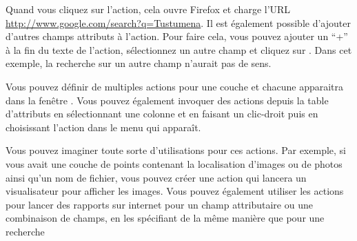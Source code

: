 Quand vous cliquez sur l'action, cela ouvre Firefox et charge l'URL \url{http://www.google.com/search?q=Tustumena}. Il est \'egalement possible d'ajouter d'autres champs attributs \`a l'action. Pour faire cela, vous pouvez ajouter un ``+'' \`a la fin du texte de l'action, s\'electionnez un autre champ et cliquez sur . Dans cet exemple, la recherche sur un autre champ n'aurait pas de sens.

Vous pouvez d\'efinir de multiples actions pour une couche et chacune apparaitra dans la fen\^etre . Vous pouvez \'egalement invoquer des actions depuis la table d'attributs en s\'electionnant une colonne et en faisant un clic-droit puis en choisissant l'action dans le menu qui appara\^it.

Vous pouvez imaginer toute sorte d'utilisations pour ces actions. Par exemple, si vous avait une couche de points contenant la localisation d'images ou de photos ainsi qu'un nom de fichier, vous pouvez cr\'eer une action qui lancera un visualisateur pour afficher les images. Vous pouvez \'egalement utiliser les actions pour lancer des rapports sur internet pour un champ attributaire ou une combinaison de champs, en les sp\'ecifiant de la m\^eme mani\`ere que pour une recherche

